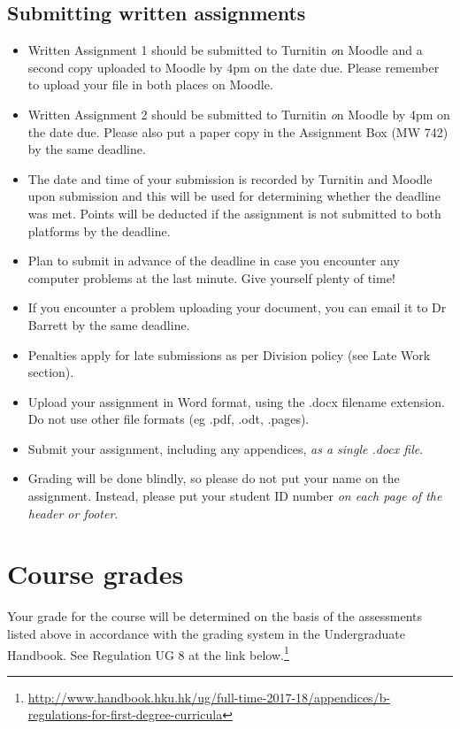 \documentclass[a4paper, 11pt]{article}
\begin{document}
\begin{description}
\subsection*{Submitting written assignments}
	\begin{itemize}
	\item Written Assignment 1 should be submitted to Turnitin \emph on Moodle {and} a second copy uploaded to Moodle by 4pm on the date due. Please remember to upload your file in both places on Moodle.
	\item Written Assignment 2 should be submitted to Turnitin \emph on Moodle by 4pm on the date due. Please also put a paper copy in the Assignment Box (MW 742) by the same deadline.
	\item The date and time of your submission is recorded by Turnitin and Moodle upon submission and this will be used for determining whether the deadline was met. Points will be deducted if the assignment is not submitted to both platforms by the deadline.
	\item Plan to submit in advance of the deadline in case you encounter any computer problems at the last minute. Give yourself plenty of time!
	\item If you encounter a problem uploading your document, you can email it to Dr Barrett by the same deadline.
	\item Penalties apply for late submissions as per Division policy (see Late Work section).
	\item Upload your assignment in Word format, using the .docx filename extension. Do not use other file formats (eg .pdf, .odt, .pages).
	\item Submit your assignment, including any appendices, \emph{as a single .docx file}.
	\item Grading will be done blindly, so please do not put your name on the assignment. Instead, please put your student ID number \emph{on each page of the header or footer}.
	\end{itemize}
\end{description}

\section*{Course grades}

Your grade for the course will be determined on the basis of the assessments listed above in accordance with the grading system in the Undergraduate Handbook. See Regulation UG 8 at the link below.\footnote{\url{http://www.handbook.hku.hk/ug/full-time-2017-18/appendices/b-regulations-for-first-degree-curricula}}
\end{document}
